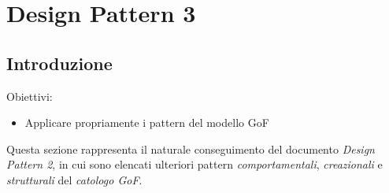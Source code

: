 \documentclass{article}
\begin{document}
\pagestyle{empty}
\section*{Design Pattern 3}
\large

\subsection*{Introduzione}
\large
Obiettivi:
\begin{itemize}
    \renewcommand{\labelitemi}{-}
    \itemsep0em
    \item Applicare propriamente i pattern del modello GoF 
\end{itemize}
Questa sezione rappresenta il naturale conseguimento del documento \textit{Design Pattern 2}, in cui sono elencati ulteriori pattern \textit{comportamentali}, \textit{creazionali} e \textit{strutturali} del \textit{catologo GoF}.
\end{document}
